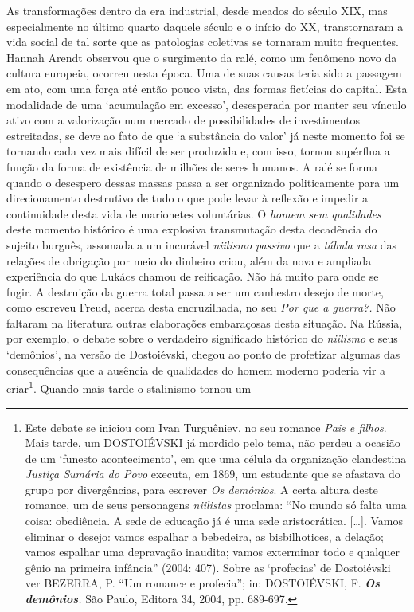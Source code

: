 As transformações dentro da era industrial, desde meados do século XIX,
mas especialmente no último quarto daquele século e o início do XX,
transtornaram a vida social de tal sorte que as patologias coletivas se
tornaram muito frequentes. Hannah Arendt observou que o surgimento da
ralé, como um fenômeno novo da cultura europeia, ocorreu nesta época.
Uma de suas causas teria sido a passagem em ato, com uma força até então
pouco vista, das formas fictícias do capital. Esta modalidade de uma
`acumulação em excesso', desesperada por manter seu vínculo ativo com a
valorização num mercado de possibilidades de investimentos estreitadas,
se deve ao fato de que `a substância do valor' já neste momento foi se
tornando cada vez mais difícil de ser produzida e, com isso, tornou
supérflua a função da forma de existência de milhões de seres humanos. A
ralé se forma quando o desespero dessas massas passa a ser organizado
politicamente para um direcionamento destrutivo de tudo o que pode levar
à reflexão e impedir a continuidade desta vida de marionetes
voluntárias. O \emph{homem sem qualidades} deste momento histórico é uma
explosiva transmutação desta decadência do sujeito burguês, assomada a
um incurável \emph{niilismo passivo} que a \emph{tábula rasa} das
relações de obrigação por meio do dinheiro criou, além da nova e
ampliada experiência do que Lukács chamou de reificação. Não há muito
para onde se fugir. A destruição da guerra total passa a ser um
canhestro desejo de morte, como escreveu Freud, acerca desta
encruzilhada, no seu \emph{Por que a guerra?.} Não faltaram na
literatura outras elaborações embaraçosas desta situação. Na Rússia, por
exemplo, o debate sobre o verdadeiro significado histórico do
\emph{niilismo} e seus `demônios', na versão de Dostoiévski, chegou ao
ponto de profetizar algumas das consequências que a ausência de
qualidades do homem moderno poderia vir a criar\footnote{Este debate se
  iniciou com Ivan Turguêniev, no seu romance \emph{Pais e filhos}. Mais
  tarde, um DOSTOIÉVSKI já mordido pelo tema, não perdeu a ocasião de um
  `funesto acontecimento', em que uma célula da organização clandestina
  \emph{Justiça Sumária do Povo} executa, em 1869, um estudante que se
  afastava do grupo por divergências, para escrever \emph{Os demônios}.
  A certa altura deste romance, um de seus personagens \emph{niilistas}
  proclama: ``No mundo só falta uma coisa: obediência. A sede de
  educação já é uma sede aristocrática. {[}\ldots{}{]}. Vamos eliminar o
  desejo: vamos espalhar a bebedeira, as bisbilhotices, a delação; vamos
  espalhar uma depravação inaudita; vamos exterminar todo e qualquer
  gênio na primeira infância'' (2004: 407). Sobre as `profecias' de
  Dostoiévski ver BEZERRA, P. ``Um romance e profecia''; in:
  DOSTOIÉVSKI, F. \emph{\textbf{Os demônios}.} São Paulo, Editora 34,
  2004, pp. 689-697.}. Quando mais tarde o stalinismo tornou um
